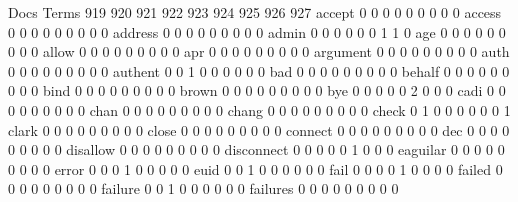 \documentclass[compress,8pt]{beamer}
\begin{document}
\begin{frame}
\begin{Schunk}
                                          Docs
Terms                                      919 920 921 922 923 924 925 926 927
  accept                                     0   0   0   0   0   0   0   0   0
  access                                     0   0   0   0   0   0   0   0   0
  address                                    0   0   0   0   0   0   0   0   0
  admin                                      0   0   0   0   0   0   1   1   0
  age                                        0   0   0   0   0   0   0   0   0
  allow                                      0   0   0   0   0   0   0   0   0
  apr                                        0   0   0   0   0   0   0   0   0
  argument                                   0   0   0   0   0   0   0   0   0
  auth                                       0   0   0   0   0   0   0   0   0
  authent                                    0   0   1   0   0   0   0   0   0
  bad                                        0   0   0   0   0   0   0   0   0
  behalf                                     0   0   0   0   0   0   0   0   0
  bind                                       0   0   0   0   0   0   0   0   0
  brown                                      0   0   0   0   0   0   0   0   0
  bye                                        0   0   0   0   0   2   0   0   0
  cadi                                       0   0   0   0   0   0   0   0   0
  chan                                       0   0   0   0   0   0   0   0   0
  chang                                      0   0   0   0   0   0   0   0   0
  check                                      0   1   0   0   0   0   0   0   1
  clark                                      0   0   0   0   0   0   0   0   0
  close                                      0   0   0   0   0   0   0   0   0
  connect                                    0   0   0   0   0   0   0   0   0
  dec                                        0   0   0   0   0   0   0   0   0
  disallow                                   0   0   0   0   0   0   0   0   0
  disconnect                                 0   0   0   0   0   1   0   0   0
  eaguilar                                   0   0   0   0   0   0   0   0   0
  error                                      0   0   0   1   0   0   0   0   0
  euid                                       0   0   1   0   0   0   0   0   0
  fail                                       0   0   0   0   1   0   0   0   0
  failed                                     0   0   0   0   0   0   0   0   0
  failure                                    0   0   1   0   0   0   0   0   0
  failures                                   0   0   0   0   0   0   0   0   0

\end{Schunk}
\end{frame}
\end{document}
